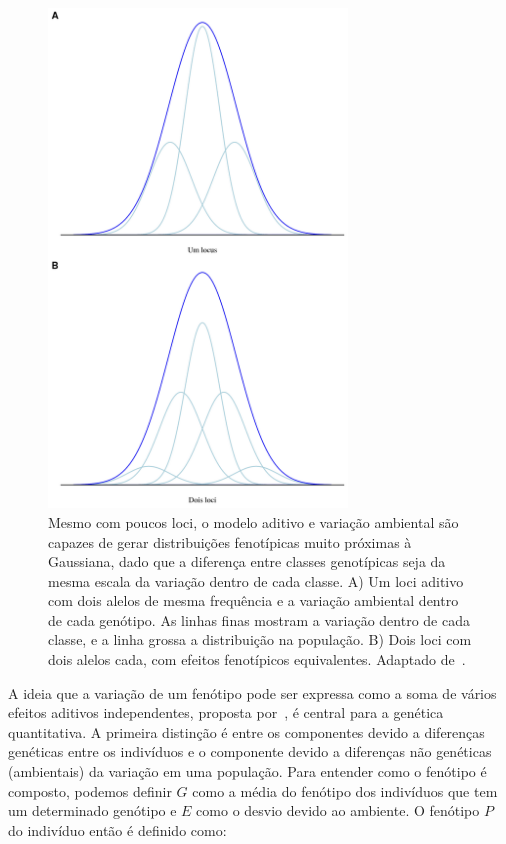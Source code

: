 \begin{refsection}
\begin{figure}
    \centering
    \includegraphics[width=300px]{discrete_gaussian.png}
    \caption[Variação contínua]{Mesmo com poucos loci, o modelo aditivo e variação ambiental são capazes de gerar distribuições fenotípicas muito próximas à Gaussiana, dado que a diferença entre classes genotípicas seja da mesma escala da variação dentro de cada classe. A) Um loci aditivo com dois alelos de mesma frequência e a variação ambiental dentro de cada genótipo. As linhas finas mostram a variação dentro de cada classe, e a linha grossa a distribuição na população. B) Dois loci com dois alelos cada, com efeitos fenotípicos equivalentes. Adaptado de~\textcite{Barton2007-hq}.}
    \label{discrete_aleles}
\end{figure}

A ideia que a variação de um fenótipo pode ser expressa como a soma de vários
efeitos aditivos independentes, proposta por~\textcite{Fisher1930-bp}, é
central para a genética quantitativa. A primeira distinção é entre os
componentes devido a diferenças genéticas entre os indivíduos e o componente
devido a diferenças não genéticas (ambientais) da variação em uma população.
Para entender como o fenótipo é composto, podemos definir $G$ como a média do
fenótipo dos indivíduos que tem um determinado genótipo e $E$ como o desvio
devido ao ambiente. O fenótipo $P$ do indivíduo então é definido como:


\end{refsection}
